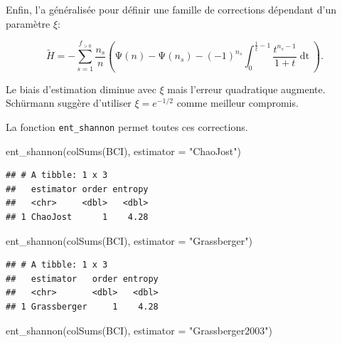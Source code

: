 \documentclass[
  11pt,
  american,
  a4paper,
  extrafontsizes,onecolumn,openright
  ]{memoir}
\newenvironment{Shaded}{\begin{snugshade}}{\end{snugshade}}
\newcommand{\AttributeTok}[1]{\textcolor[rgb]{0.77,0.63,0.00}{#1}}
\newcommand{\FunctionTok}[1]{\textcolor[rgb]{0.00,0.00,0.00}{#1}}
\newcommand{\NormalTok}[1]{#1}
\newcommand{\StringTok}[1]{\textcolor[rgb]{0.31,0.60,0.02}{#1}}
\begin{document}
Enfin, \textcite{Schurmann2004} l'a généralisée pour définir une famille de corrections dépendant d'un paramètre \(\xi\):

\begin{equation}
  \label{eq:Schurmann2004}
  \tilde{H} 
  = -\sum^{f_{>0}}_{s=1}{
    \frac{n_s}{n} \left( \mathrm{\Psi}\left( n \right) - \mathrm{\Psi}\left( n_s \right) 
    - {\left( -1 \right)}^{n_s} \int^{\frac{1}{\xi} - 1}_0{\frac{t^{n_s - 1}}{1 + t} \mathop{dt}} \right)
  }.
\end{equation}

Le biais d'estimation diminue avec \(\xi\) mais l'erreur quadratique augmente.
Schürmann suggère d'utiliser \(\xi=e^{-1/2}\) comme meilleur compromis.

La fonction \texttt{ent\_shannon} permet toutes ces corrections.

\scriptsize

\begin{Shaded}
\begin{Highlighting}[]
\FunctionTok{ent\_shannon}\NormalTok{(}\FunctionTok{colSums}\NormalTok{(BCI), }\AttributeTok{estimator =} \StringTok{"ChaoJost"}\NormalTok{)}
\end{Highlighting}
\end{Shaded}

\begin{verbatim}
## # A tibble: 1 x 3
##   estimator order entropy
##   <chr>     <dbl>   <dbl>
## 1 ChaoJost      1    4.28
\end{verbatim}

\begin{Shaded}
\begin{Highlighting}[]
\FunctionTok{ent\_shannon}\NormalTok{(}\FunctionTok{colSums}\NormalTok{(BCI), }\AttributeTok{estimator =} \StringTok{"Grassberger"}\NormalTok{)}
\end{Highlighting}
\end{Shaded}

\begin{verbatim}
## # A tibble: 1 x 3
##   estimator   order entropy
##   <chr>       <dbl>   <dbl>
## 1 Grassberger     1    4.28
\end{verbatim}

\begin{Shaded}
\begin{Highlighting}[]
\FunctionTok{ent\_shannon}\NormalTok{(}\FunctionTok{colSums}\NormalTok{(BCI), }\AttributeTok{estimator =} \StringTok{"Grassberger2003"}\NormalTok{)}
\end{Highlighting}
\end{Shaded}
\end{document}
